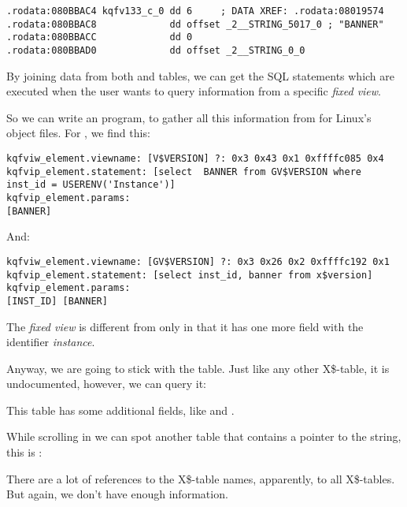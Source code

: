 \begin{lstlisting}[caption=kqf.o,style=customasmx86]
.rodata:080BBAC4 kqfv133_c_0 dd 6     ; DATA XREF: .rodata:08019574
.rodata:080BBAC8             dd offset _2__STRING_5017_0 ; "BANNER"
.rodata:080BBACC             dd 0
.rodata:080BBAD0             dd offset _2__STRING_0_0
\end{lstlisting}

By joining data from both  and  tables, we can get the SQL statements which are executed when the user wants to query information from a specific \emph{fixed view}.

So we can write an \oracletables program, to gather all this information from \oracle for Linux's object files.
For , we find this:

\begin{lstlisting}[caption=Result of \OracleTablesName]
kqfviw_element.viewname: [V$VERSION] ?: 0x3 0x43 0x1 0xffffc085 0x4
kqfvip_element.statement: [select  BANNER from GV$VERSION where inst_id = USERENV('Instance')]
kqfvip_element.params:
[BANNER] 
\end{lstlisting}

And:

\begin{lstlisting}[caption=Result of \OracleTablesName]
kqfviw_element.viewname: [GV$VERSION] ?: 0x3 0x26 0x2 0xffffc192 0x1
kqfvip_element.statement: [select inst_id, banner from x$version]
kqfvip_element.params:
[INST_ID] [BANNER] 
\end{lstlisting}

The  \emph{fixed view} is different from  only in that it has one more field with the identifier \emph{instance}.

Anyway, we are going to stick with the  table. Just like any other X\$-table, it is undocumented, however, we can query it:



This table has some additional fields, like  and .

While scrolling  in \IDA we can spot another table that contains a pointer to the  string, this is :



There are a lot of references to the X\$-table names, apparently, to all  X\$-tables.
But again, we don't have enough information.

